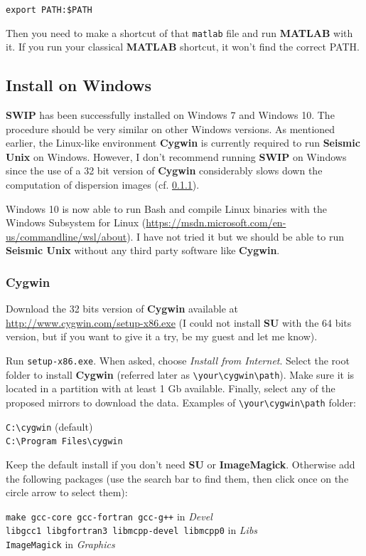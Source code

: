 \documentclass[twoside,a4paper]{article}
\def\SWIP{\textbf{SWIP}}
\def\SU{\textbf{SU}}
\def\SeismicUnix{\textbf{Seismic Unix}}
\def\ImageMagick{\textbf{ImageMagick}}
\def\MATLAB{\textbf{MATLAB}}
\def\Cygwin{\textbf{Cygwin}}
\begin{document}
\verb|export PATH:$PATH|

Then you need to make a shortcut of that \verb|matlab| file and run {\MATLAB} with it. If you run your classical {\MATLAB} shortcut, it won't find the correct PATH.

\clearpage
\subsection{Install on Windows}
{\SWIP} has been successfully installed on Windows 7 and Windows 10. The procedure should be very similar on other Windows versions. As mentioned earlier, the Linux-like environment {\Cygwin} is currently required to run {\SeismicUnix} on Windows. However, I don't recommend running {\SWIP} on Windows since the use of a 32 bit version of {\Cygwin} considerably slows down the computation of dispersion images (cf. \ref{sec:cygwin}).

Windows 10 is now able to run Bash and compile Linux binaries with the Windows Subsystem for Linux (\url{https://msdn.microsoft.com/en-us/commandline/wsl/about}). I have not tried it but we should be able to run {\SeismicUnix} without any third party software like {\Cygwin}.

\subsubsection{Cygwin}
\label{sec:cygwin}
Download the 32 bits version of {\Cygwin} available at \url{http://www.cygwin.com/setup-x86.exe} (I could not install {\SU} with the 64 bits version, but if you want to give it a try, be my guest and let me know).

Run \verb|setup-x86.exe|. When asked, choose \textit{Install from Internet}. Select the root folder to install {\Cygwin} (referred later as \verb|\your\cygwin\path|). Make sure it is located in a partition with at least 1 Gb available. Finally, select any of the proposed mirrors to download the data.
Examples of \verb|\your\cygwin\path| folder:

\verb|C:\cygwin| (default)\\
\verb|C:\Program Files\cygwin|

Keep the default install if you don't need {\SU} or {\ImageMagick}. Otherwise add the following packages (use the search bar to find them, then click once on the circle arrow to select them):

\verb|make gcc-core gcc-fortran gcc-g++| in \textit{Devel}\\
\verb|libgcc1 libgfortran3 libmcpp-devel libmcpp0| in \textit{Libs}\\
\verb|ImageMagick| in \textit{Graphics}
\end{document}
